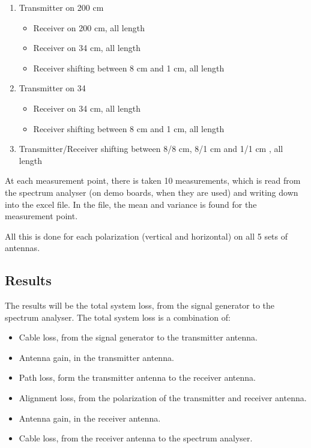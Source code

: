 \begin{enumerate}
\item Transmitter on 200 cm
\begin{itemize}
\item Receiver on 200 cm, all length
\item Receiver on 34 cm, all length
\item Receiver shifting between 8 cm and 1 cm, all length
\end{itemize}
\item Transmitter on 34
\begin{itemize}
\item Receiver on 34 cm, all length
\item Receiver shifting between 8 cm and 1 cm, all length
\end{itemize}
\item Transmitter/Receiver shifting between 8/8 cm, 8/1 cm and 1/1 cm , all length
\end{enumerate}

At each measurement point, there is taken 10 measurements, which is read from the spectrum analyser (on demo boards, when they are used) and writing down into the excel file. In the file, the mean and variance is found for the measurement point.

All this is done for each polarization (vertical and horizontal) on all 5 sets of antennas.

\subsection*{Results}
The results will be the total system loss, from the signal generator to the spectrum analyser. The total system loss is a combination of:

\begin{itemize}
\item Cable loss, from the signal generator to the transmitter antenna.
\item Antenna gain, in the transmitter antenna.
\item Path loss, form the transmitter antenna to the receiver antenna.
\item Alignment loss, from the polarization of the transmitter and receiver antenna.
\item Antenna gain, in the receiver antenna.
\item Cable loss, from the receiver antenna to the spectrum analyser.
\end{itemize}
